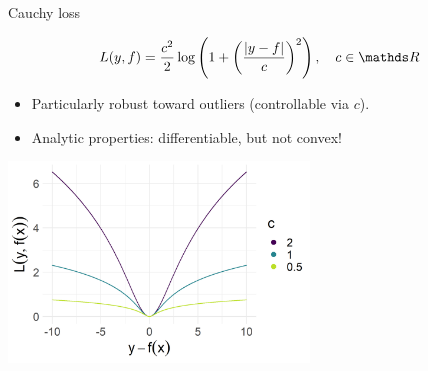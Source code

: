 \documentclass[11pt,compress,t,notes=noshow, xcolor=table]{beamer}
\begin{document}
\begin{vbframe}{Cauchy loss}


$$
L(y,f) = \frac{c^2}{2} \log \left( 1 + \left( \frac{\left|y - f\right|}{c}\right)^2 \right), 
\quad c \in \R
$$

\normalsize
\begin{itemize}
\item Particularly robust toward outliers (controllable via $c$).
\item Analytic properties: differentiable, but not convex! 
\end{itemize}

\vfill

\begin{center}
\includegraphics[width = 0.6\textwidth]{figure/loss_cauchy.png}
\end{center}

\end{vbframe}
\end{document}
